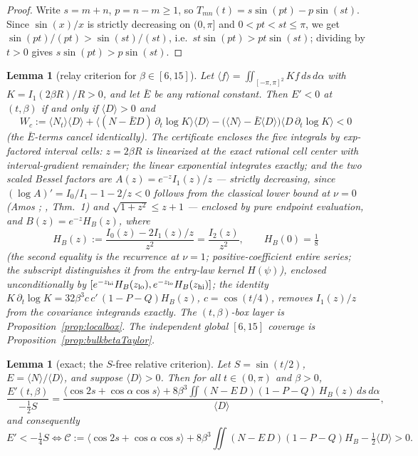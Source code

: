 \documentclass[11pt]{article}
\newtheorem{lemma}[theorem]{Lemma}
\theoremstyle{remark}
\begin{document}
\begin{proof}
Write $s=m+n$, $p=n-m\ge1$, so $T_{mn}(t)=s\sin(pt)-p\sin(st)$.
Since $\sin(x)/x$ is strictly decreasing on $(0,\pi]$ and
$0<pt<st\le\pi$, we get $\sin(pt)/(pt)>\sin(st)/(st)$, i.e.\
$st\sin(pt)>pt\sin(st)$; dividing by $t>0$ gives
$s\sin(pt)>p\sin(st)$.
\end{proof}

\begin{lemma}[{relay criterion for $\beta\in[6,15]$}]
\label{lem:relaycrit}
Let $\langle f\rangle=\iint_{[-\pi,\pi]^2}Kf\,ds\,d\alpha$ with
$K=I_1(2\beta R)/R>0$, and let $\bar E$ be any rational constant. Then
$E'<0$ at $(t,\beta)$ if and only if $\langle D\rangle>0$ and
\[
W_c:=\langle N_t\rangle\langle D\rangle
+\langle (N-\bar E D)\,\partial_t\!\log K\rangle\langle D\rangle
-\bigl(\langle N\rangle-\bar E\langle D\rangle\bigr)
\langle D\,\partial_t\!\log K\rangle<0
\]
(the $\bar E$-terms cancel identically). The certificate encloses the
five integrals by exp-factored interval cells: $z=2\beta R$ is
linearized at the exact rational cell center with interval-gradient
remainder; the linear exponential integrates exactly; and the two
scaled Bessel factors are
$A(z)=e^{-z}I_1(z)/z$ --- strictly decreasing, since
$(\log A)'=I_0/I_1-1-2/z<0$ follows from the classical lower bound
at $\nu=0$ (Amos \cite{Amos}; \cite{Segura2011}, Thm.~1) and
$\sqrt{1+z^2}\le z+1$ ---
enclosed by pure endpoint evaluation, and $B(z)=e^{-z}H_B(z)$, where
\[
H_B(z):=\frac{I_0(z)-2I_1(z)/z}{z^2}=\frac{I_2(z)}{z^2},\qquad
H_B(0)=\tfrac18
\]
\textup{(}the second equality is the recurrence
\cite[10.29.1]{DLMF} at $\nu=1$; positive-coefficient entire
series; the subscript
distinguishes it from the entry-law kernel $H(\psi)$\textup{)},
enclosed unconditionally by $[e^{-z_{\rm hi}}H_B(z_{\rm lo}),
e^{-z_{\rm lo}}H_B(z_{\rm hi})]$; the identity
$K\,\partial_t\!\log K=32\beta^3c\,c'\,(1-P-Q)H_B(z)$, $c=\cos(t/4)$,
removes $I_1(z)/z$ from the covariance integrands exactly. The
$(t,\beta)$-box layer is Proposition~\ref{prop:localbox}.  The independent
global $[6,15]$ coverage is Proposition~\ref{prop:bulkbetaTaylor}.
\end{lemma}

\begin{lemma}[exact; the $S$-free relative criterion]\label{lem:sfree}
Let $S=\sin(t/2)$, $E=\langle N\rangle/\langle D\rangle$, and suppose
$\langle D\rangle>0$. Then for all $t\in(0,\pi)$ and $\beta>0$,
\[
\frac{E'(t,\beta)}{-\tfrac12 S}
=\frac{\bigl\langle \cos 2s+\cos\alpha\cos s\bigr\rangle
+8\beta^3\!\iint (N-E\,D)(1-P-Q)\,H_B(z)\,ds\,d\alpha}
{\langle D\rangle},
\]
and consequently
\[
E'<-\tfrac14 S
\iff
\mathcal C:=\bigl\langle \cos 2s+\cos\alpha\cos s\bigr\rangle
+8\beta^3\!\iint (N-E\,D)(1-P-Q)H_B
-\tfrac12\langle D\rangle>0 .
\]
\end{lemma}
\end{document}
